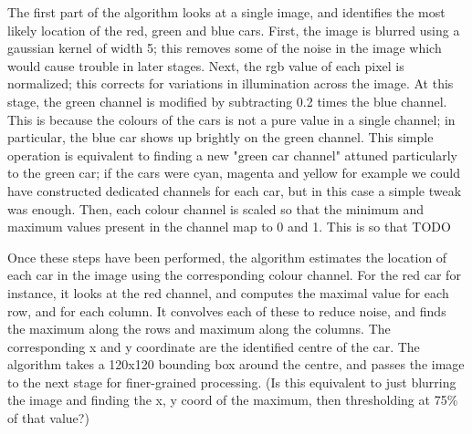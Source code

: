 The first part of the algorithm looks at a single image, and identifies the most likely location of the red, green and blue cars. First, the image is blurred using a gaussian kernel of width 5; this removes some of the noise in the image which would cause trouble in later stages. Next, the rgb value of each pixel is normalized; this corrects for variations in illumination across the image. At this stage, the green channel is modified by subtracting 0.2 times the blue channel. This is because the colours of the cars is not a pure value in a single channel; in particular, the blue car shows up brightly on the green channel. This simple operation is equivalent to finding a new "green car channel" attuned particularly to the green car; if the cars were cyan, magenta and yellow for example we could have constructed dedicated channels for each car, but in this case a simple tweak was enough. Then, each colour channel is scaled so that the minimum and maximum values present in the channel map to 0 and 1. This is so that TODO

Once these steps have been performed, the algorithm estimates the location of each car in the image using the corresponding colour channel. For the red car for instance, it looks at the red channel, and computes the maximal value for each row, and for each column. It convolves each of these to reduce noise, and finds the maximum along the rows and maximum along the columns. The corresponding x and y coordinate are the identified centre of the car. The algorithm takes a 120x120 bounding box around the centre, and passes the image to the next stage for finer-grained processing.
(Is this equivalent to just blurring the image and finding the x, y coord of the maximum, then thresholding at 75\% of that value?)
